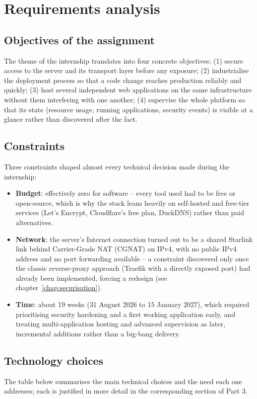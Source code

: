 \chapter{Requirements analysis}
\label{chap:besoin}

\section{Objectives of the assignment}
The theme of the internship translates into four concrete objectives: (1) secure access to the server and its transport layer before any exposure; (2) industrialise the deployment process so that a code change reaches production reliably and quickly; (3) host several independent web applications on the same infrastructure without them interfering with one another; (4) supervise the whole platform so that its state (resource usage, running applications, security events) is visible at a glance rather than discovered after the fact.

\section{Constraints}
Three constraints shaped almost every technical decision made during the internship:
\begin{itemize}
  \item \textbf{Budget}: effectively zero for software -- every tool used had to be free or open-source, which is why the stack leans heavily on self-hosted and free-tier services (Let's Encrypt, Cloudflare's free plan, DuckDNS) rather than paid alternatives.
  \item \textbf{Network}: the server's Internet connection turned out to be a shared Starlink link behind Carrier-Grade NAT (CGNAT) on IPv4, with no public IPv4 address and no port forwarding available -- a constraint discovered only once the classic reverse-proxy approach (Traefik with a directly exposed port) had already been implemented, forcing a redesign (see chapter~\ref{chap:securisation}).
  \item \textbf{Time}: about 19 weeks (31 August 2026 to 15 January 2027), which required prioritising security hardening and a first working application early, and treating multi-application hosting and advanced supervision as later, incremental additions rather than a big-bang delivery.
\end{itemize}

\section{Technology choices}
The table below summarises the main technical choices and the need each one addresses; each is justified in more detail in the corresponding section of Part 3.

